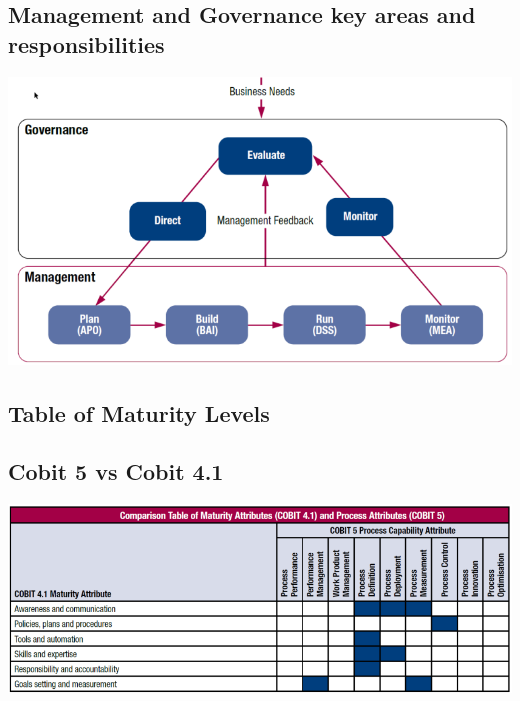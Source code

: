 \documentclass[a4]{article}
\begin{document}
\begin{multicols}{3}
\subsection{Management and Governance key areas and responsibilities}
\begin{center}
    \includegraphics[width=\columnwidth]{cobit-management-governance-key-areas.png}
\end{center}

\subsection{Table of Maturity Levels}

\subsection{Cobit 5 vs Cobit 4.1}
\begin{center}
    \begin{minipage}{\columnwidth}
        \includegraphics[width=\columnwidth]{cobit5-vs-cobit41.png}
    \end{minipage}
\end{center}


\end{multicols}
\end{document}
